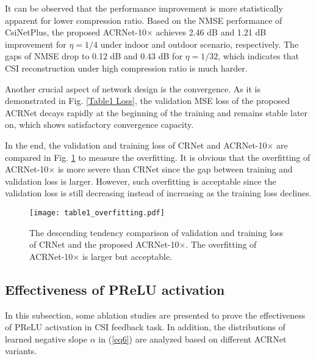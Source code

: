 \documentclass[12pt, draftclsnofoot, onecolumn]{IEEEtran}
\begin{document}
It can be observed that the performance improvement is more statistically apparent for lower compression ratio. Based on the NMSE performance of CsiNetPlus, the proposed ACRNet-10$\times$ achieves 2.46 dB and 1.21 dB improvement for $\eta=1/4$ under indoor and outdoor scenario, respectively. The gaps of NMSE drop to 0.12 dB and 0.43 dB for $\eta=1/32$, which indicates that CSI reconstruction under high compression ratio is much harder.

Another crucial aspect of network design is the convergence. As it is demonstrated in Fig. \ref{Table1 Loss}, the validation MSE loss of the proposed ACRNet decays rapidly at the beginning of the training and remains stable later on, which shows satisfactory convergence capacity.

In the end, the validation and training loss of CRNet and ACRNet-10$\times$ are compared in Fig. \ref{Table1 Overfitting} to measure the overfitting. It is obvious that the overfitting of ACRNet-10$\times$ is more severe than CRNet since the gap between training and validation loss is larger. However, such overfitting is acceptable since the validation loss is still decreasing instead of increasing as the training loss declines.

\begin{figure}[!t]
\centering
\texttt{[image: table1\_overfitting.pdf]}
\caption{The descending tendency comparison of validation and training loss of CRNet and the proposed ACRNet-10$\times$. The overfitting of ACRNet-10$\times$ is larger but acceptable.}
\label{Table1 Overfitting}
\end{figure}

\subsection{Effectiveness of PReLU activation} \label{Section5-3}

In this subsection, some ablation studies are presented to prove the effectiveness of PReLU activation in CSI feedback task. In addition, the distributions of learned negative slope $\alpha$ in (\ref{eq6}) are analyzed based on different ACRNet variants.
\end{document}
